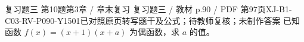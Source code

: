 \par\noindent\begin{minipage}{\linewidth}
\begin{bankitem}{复习题三 第10题}{第3章 / 章末复习 复习题三 / 教材 p.90 / PDF 第97页}{XJ-B1-C03-RV-P090-Y1501}{已对照原页转写题干及公式；待教师复核；未制作答案}
已知函数 $f(x)=(x+1)(x+a)$ 为偶函数，求 $a$ 的值。
\end{bankitem}
\end{minipage}\par\medskip
